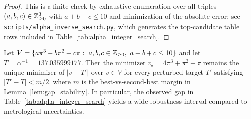 \begin{proof}
This is a finite check by exhaustive enumeration over all triples $(a,b,c)\in\mathbb{Z}_{\ge 0}^3$ with $a+b+c\le 10$ and minimization of the absolute error; see \texttt{scripts/alpha\_inverse\_search.py}, which generates the top-candidate table rows included in Table~\ref{tab:alpha_integer_search}.
\end{proof}

\begin{corollary}
\label{cor:alpha_gap_robustness}
Let $V=\{a\pi^3+b\pi^2+c\pi:\ a,b,c\in\ZZ_{\ge 0},\ a+b+c\le 10\}$ and let $T=\alpha^{-1}=137.035999177$. Then the minimizer $v_\star=4\pi^3+\pi^2+\pi$ remains the unique minimizer of $|v-T'|$ over $v\in V$ for every perturbed target $T'$ satisfying $|T'-T|<m/2$, where $m$ is the best-vs-second-best margin in Lemma~\ref{lem:gap_stability}. In particular, the observed gap in Table~\ref{tab:alpha_integer_search} yields a wide robustness interval compared to metrological uncertainties.
\end{corollary}


